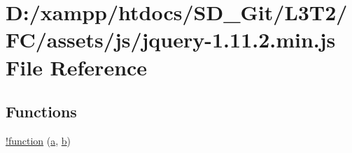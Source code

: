 \hypertarget{assets_2js_2jquery-1_811_82_8min_8js}{}\section{D\+:/xampp/htdocs/\+S\+D\+\_\+\+Git/\+L3\+T2/\+F\+C/assets/js/jquery-\/1.11.2.min.\+js File Reference}
\label{assets_2js_2jquery-1_811_82_8min_8js}
\subsection*{Functions}
\begin{DoxyCompactItemize}
\item 
\hyperlink{assets_2js_2jquery-1_811_82_8min_8js_a43f0b96ea8ec44ca20ba86809a785614}{!function} (\hyperlink{_admin_2assets_2js_2bootstrap_8min_8js_a1f5870dcf487187f13d5fd328ed9e6e7}{a}, \hyperlink{_admin_2assets_2js_2bootstrap_8min_8js_a398bb8542498d1b14178b02b99df309b}{b})
\item 

\end{DoxyCompactItemize}
